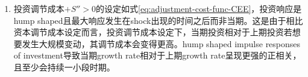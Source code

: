 \begin{enumerate}
\begin{enumerate}
\item 投资调节成本$+ S'' >0$的设定如式\eqref{eq:adjustment-cost-func-CEE}，投资响应是hump shaped且最大响应发生在shock出现的时间之后而非当期。这是由于相比资本调节成本设定而言，投资调节成本设定下，当期投资相对于上期投资若想要发生大规模变动，其调节成本会变得更高。hump shaped impulse responses of investment导致当期growth rate相对于上期growth rate呈现更强的正相关，且至少会持续一小段时期。
\end{enumerate}
\end{enumerate}





